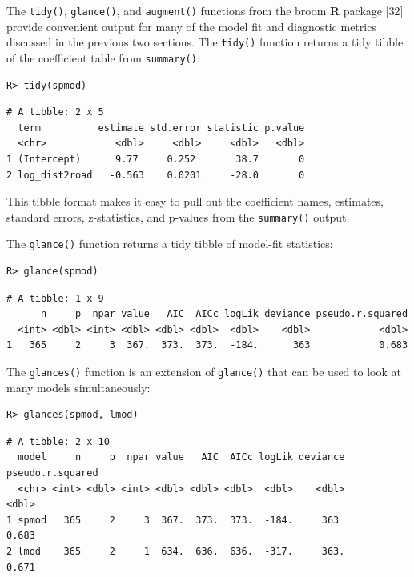 \documentclass[10pt,letterpaper]{article}
\begin{document}
The \texttt{tidy()}, \texttt{glance()}, and \texttt{augment()} functions
from the broom \textbf{\textsf{R}} package {[}32{]} provide convenient
output for many of the model fit and diagnostic metrics discussed in the
previous two sections. The \texttt{tidy()} function returns a tidy
tibble of the coefficient table from \texttt{summary()}:

\begin{verbatim}
R> tidy(spmod)
\end{verbatim}

\begin{verbatim}
# A tibble: 2 x 5
  term          estimate std.error statistic p.value
  <chr>            <dbl>     <dbl>     <dbl>   <dbl>
1 (Intercept)      9.77     0.252       38.7       0
2 log_dist2road   -0.563    0.0201     -28.0       0
\end{verbatim}

This tibble format makes it easy to pull out the coefficient names,
estimates, standard errors, z-statistics, and p-values from the
\texttt{summary()} output.

The \texttt{glance()} function returns a tidy tibble of model-fit
statistics:

\begin{verbatim}
R> glance(spmod)
\end{verbatim}

\begin{verbatim}
# A tibble: 1 x 9
      n     p  npar value   AIC  AICc logLik deviance pseudo.r.squared
  <int> <dbl> <int> <dbl> <dbl> <dbl>  <dbl>    <dbl>            <dbl>
1   365     2     3  367.  373.  373.  -184.      363            0.683
\end{verbatim}

The \texttt{glances()} function is an extension of \texttt{glance()}
that can be used to look at many models simultaneously:

\begin{verbatim}
R> glances(spmod, lmod)
\end{verbatim}

\begin{verbatim}
# A tibble: 2 x 10
  model     n     p  npar value   AIC  AICc logLik deviance pseudo.r.squared
  <chr> <int> <dbl> <int> <dbl> <dbl> <dbl>  <dbl>    <dbl>            <dbl>
1 spmod   365     2     3  367.  373.  373.  -184.     363             0.683
2 lmod    365     2     1  634.  636.  636.  -317.     363.            0.671
\end{verbatim}
\end{document}
